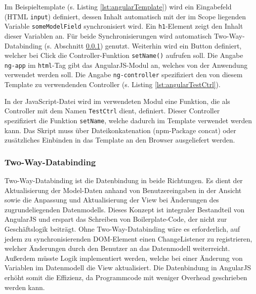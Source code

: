 \begin{figure}[H]

\end{figure}

Im Beispieltemplate (s. Listing \ref{lst:angularTemplate}) wird ein Eingabefeld (HTML \texttt{input}) definiert, dessen Inhalt automatisch mit der im Scope liegenden Variable \texttt{someModelField} synchronisiert wird. Ein \texttt{h1}-Element zeigt den Inhalt dieser Variablen an. Für beide Synchronisierungen wird automatisch Two-Way-Databinding (s. Abschnitt \ref{sec:twoWayDatabinding}) genutzt. Weiterhin wird ein Button definiert, welcher bei Click die Controller-Funktion \texttt{setName()} aufrufen soll. Die Angabe \texttt{ng-app} im \texttt{html}-Tag gibt das AngularJS-Modul an, welches von der Anwendung verwendet werden soll. Die Angabe \texttt{ng-controller} spezifiziert den von diesem Template zu verwendenden Controller (s. Listing \ref{lst:angularTestCtrl}).

\begin{figure}[H]
	
\end{figure}

In der JavaScript-Datei wird im verwendeten Modul eine Funktion, die als Controller mit dem Namen \texttt{TestCtrl} dient, definiert. Dieser Controller spezifiziert die Funktion \texttt{setName}, welche dadurch im Template verwendet werden kann. Das Skript muss über Dateikonkatenation (npm-Package \glqq concat\grqq  \cite{npm-concat}) oder zusätzliches Einbinden in das Template an den Browser ausgeliefert werden.

\subsubsection{Two-Way-Databinding}
\label{sec:twoWayDatabinding}
Two-Way-Databinding ist die Datenbindung in beide Richtungen. Es dient der Aktualisierung der Model-Daten anhand von Benutzereingaben in der Ansicht sowie die Anpassung und Aktualisierung der View bei Änderungen des zugrundeliegenden Datenmodells. Dieses Konzept ist integraler Bestandteil von AngularJS und erspart das Schreiben von Boilerplate-Code, der nicht zur Geschäftslogik beiträgt. Ohne Two-Way-Databinding wäre es erforderlich, auf jedem zu synchronisierenden DOM-Element einen ChangeListener zu registrieren, welcher Änderungen durch den Benutzer an das Datenmodell weiterreicht. Außerdem müsste Logik implementiert werden, welche bei einer Änderung von Variablen im Datenmodell die View aktualisiert. Die Datenbindung in AngularJS erhöht somit die Effizienz, da Programmcode mit weniger Overhead geschrieben werden kann.\cite[][24]{angular-boehm}

